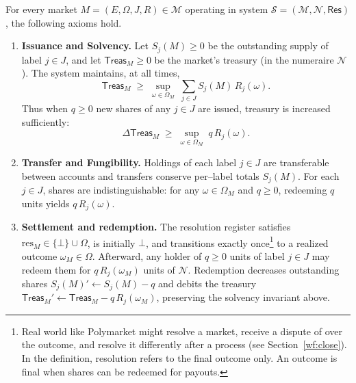 \begin{definition}\label{def:axioms} For every market $M=(E,\Omega,J,R)\in\mathcal{M}$ operating in system $\mathcal{S}=(\mathcal{M},\mathcal{N},\mathsf{Res})$, the following axioms hold.

\begin{enumerate}

\item \textbf{Issuance and Solvency.}
Let $S_j(M)\ge 0$ be the outstanding supply of label $j\in J$, and let $\mathsf{Treas}_M\ge 0$ be the market’s treasury (in the numeraire $\mathcal{N}$). The system maintains, at all times,
\begin{equation}
  \mathsf{Treas}_M \;\ge\; \sup_{\omega\in\Omega_M}\; \sum_{j\in J} S_j(M)\,R_j(\omega).
\end{equation}
Thus when $q\ge 0$ new shares of any $j\in J$ are issued, treasury is increased sufficiently:
\begin{equation}
  \Delta \mathsf{Treas}_M \;\ge\; \sup_{\omega\in\Omega_M}\; q\,R_j(\omega).
\end{equation}

\item \textbf{Transfer and Fungibility.} Holdings of each label $j\in J$ are transferable between accounts and transfers conserve per–label totals $S_j(M)$. For each $j\in J$, shares are indistinguishable: for any $\omega\in\Omega_M$ and $q\ge 0$, redeeming $q$ units yields $q\,R_j(\omega)$.
  
\item \textbf{Settlement and redemption.} The resolution register satisfies $\mathrm{res}_M\in\{\bot\}\cup\Omega$, is initially $\bot$, and transitions exactly once\footnote{Real world \depms like Polymarket might resolve a market, receive a dispute of over the outcome, and resolve it differently after a process (see Section~\ref{wf:close}). In the definition, resolution refers to the final outcome only. An outcome is final when shares can be redeemed for payouts.} to a realized outcome $\omega_M\in\Omega$. Afterward, any holder of $q\ge 0$ units of label $j\in J$ may redeem them for $q\,R_j(\omega_M)$ units of $\mathcal{N}$. Redemption decreases outstanding shares $S_j(M)'\leftarrow S_j(M)-q$ and debits the treasury $\mathsf{Treas}_M'\leftarrow \mathsf{Treas}_M - q\,R_j(\omega_M)$, preserving the solvency invariant above.
 
 \end{enumerate}
 \end{definition}




